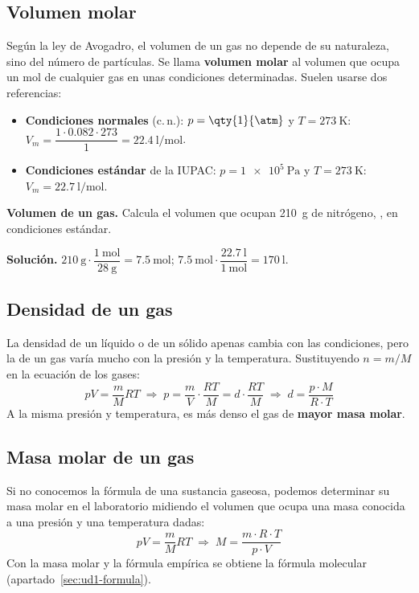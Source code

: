 \subsection{Volumen molar}

Según la ley de Avogadro, el volumen de un gas no depende de su naturaleza, sino del número de partículas. Se llama
\textbf{volumen molar} al volumen que ocupa un mol de cualquier gas en unas condiciones determinadas. Suelen usarse dos
referencias:
\begin{itemize}
    \item \textbf{Condiciones normales} (c.\,n.): \(p = \qty{1}{\atm}\) y \(T = \qty{273}{\kelvin}\):
    \(V_m = \dfrac{1 \cdot \num{0.082} \cdot 273}{1} = \qty{22.4}{\litre\per\mole}\).
    \item \textbf{Condiciones estándar} de la IUPAC: \(p = \qty{1e5}{\pascal}\) y \(T = \qty{273}{\kelvin}\):
    \(V_m = \qty{22.7}{\litre\per\mole}\).
\end{itemize}

\begin{example}
    \textbf{Volumen de un gas.} Calcula el volumen que ocupan \qty{210}{\gram} de nitrógeno, , en condiciones estándar.

    \textbf{Solución.} \(\qty{210}{\gram} \cdot \dfrac{\qty{1}{\mole}}{\qty{28}{\gram}} = \qty{7.5}{\mole}\);
    \(\qty{7.5}{\mole} \cdot \dfrac{\qty{22.7}{\litre}}{\qty{1}{\mole}} = \qty{170}{\litre}\).
\end{example}

\subsection{Densidad de un gas}

La densidad de un líquido o de un sólido apenas cambia con las condiciones, pero la de un gas varía mucho con la presión y la
temperatura. Sustituyendo \(n = m/M\) en la ecuación de los gases:
\[ p V = \frac{m}{M} R T \;\Rightarrow\; p = \frac{m}{V} \cdot \frac{R T}{M} = d \cdot \frac{R T}{M} \;\Rightarrow\;
\boxed{d = \frac{p \cdot M}{R \cdot T}} \]
A la misma presión y temperatura, es más denso el gas de \textbf{mayor masa molar}.

\subsection{Masa molar de un gas}

Si no conocemos la fórmula de una sustancia gaseosa, podemos determinar su masa molar en el laboratorio midiendo el volumen
que ocupa una masa conocida a una presión y una temperatura dadas:
\[ p V = \frac{m}{M} R T \;\Rightarrow\; M = \frac{m \cdot R \cdot T}{p \cdot V} \]
Con la masa molar y la fórmula empírica se obtiene la fórmula molecular (apartado~\ref{sec:ud1-formula}).

